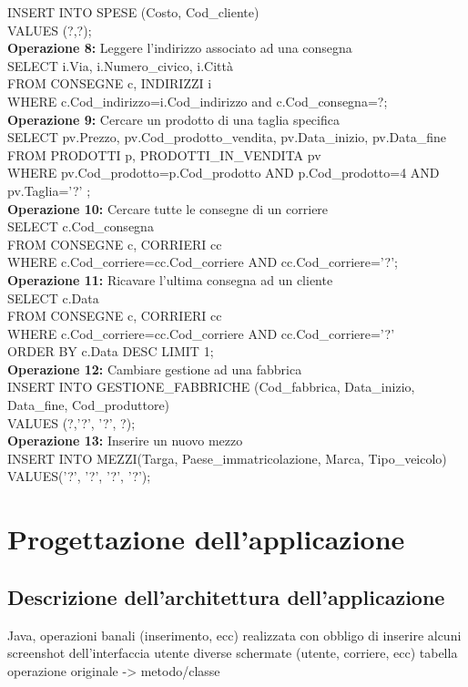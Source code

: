 \documentclass[a4paper,12pt]{report}
\begin{document}
INSERT INTO SPESE (Costo, Cod\_cliente)\\
VALUES (?,?);\\
\textbf{Operazione 8:}
Leggere l'indirizzo associato ad una consegna\\
SELECT i.Via, i.Numero\_civico, i.Città\\
FROM CONSEGNE c, INDIRIZZI i\\
WHERE c.Cod\_indirizzo=i.Cod\_indirizzo and c.Cod\_consegna=?;\\
\textbf{Operazione 9:}
Cercare un prodotto di una taglia specifica\\
SELECT pv.Prezzo, pv.Cod\_prodotto\_vendita, pv.Data\_inizio, pv.Data\_fine\\
FROM PRODOTTI p, PRODOTTI\_IN\_VENDITA pv\\
WHERE pv.Cod\_prodotto=p.Cod\_prodotto AND p.Cod\_prodotto=4 AND pv.Taglia='?' ;\\
\textbf{Operazione 10:}
Cercare tutte le consegne di un corriere\\
SELECT c.Cod\_consegna\\
FROM CONSEGNE c, CORRIERI cc\\
WHERE c.Cod\_corriere=cc.Cod\_corriere AND cc.Cod\_corriere='?';\\
\textbf{Operazione 11:}
Ricavare l'ultima consegna ad un cliente\\
SELECT c.Data\\
FROM CONSEGNE c, CORRIERI cc\\
WHERE c.Cod\_corriere=cc.Cod\_corriere AND cc.Cod\_corriere='?'\\
ORDER BY c.Data DESC LIMIT 1;\\
\textbf{Operazione 12:}
Cambiare gestione ad una fabbrica\\
INSERT INTO GESTIONE\_FABBRICHE (Cod\_fabbrica, Data\_inizio, Data\_fine, Cod\_produttore)\\
VALUES (?,'?', '?', ?);\\
\textbf{Operazione 13:}
Inserire un nuovo mezzo\\
INSERT INTO MEZZI(Targa, Paese\_immatricolazione, Marca, Tipo\_veicolo)\\
VALUES('?', '?', '?', '?');\\
\chapter{Progettazione dell'applicazione}
\section{Descrizione dell'architettura dell'applicazione}
Java, operazioni banali (inserimento, ecc)
realizzata con obbligo di inserire alcuni screenshot dell'interfaccia utente
diverse schermate (utente, corriere, ecc)
tabella operazione originale -> metodo/classe
\end{document}

